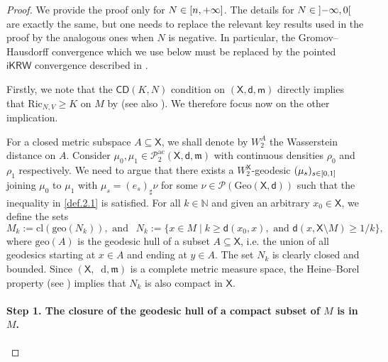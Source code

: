 \documentclass[11pt,twoside,a4paper]{article}
\newcommand*\diff{\mathop{}\!\mathrm{d}}
\newcommand{\N}{\mathbb{N}}
\newcommand{\cd}{\mathsf{CD}}
\newcommand{\X}{\mathsf{X}}
\newcommand{\di}
{\mathsf d} %
\theoremstyle{theorem}
\theoremstyle{definition}
\theoremstyle{remark}
\theoremstyle{proof}
\begin{document}
\begin{proof}
   We provide the proof only for $N \in \interval{n}{+\infty}$. The details for $N \in \ointerval{-\infty}{0}$ are exactly the same, but one needs to replace the relevant key results used in the proof by the analogous ones when $N$ is negative. In particular, the Gromov--Hausdorff convergence which we use below must be replaced by the pointed $\mathsf{iKRW}$ convergence described in \cite{chiara-mattia-sosa2023}.

   Firstly, we note that the $\cd(K,N)$ condition on $(\X, \di, \mathsf{m})$ directly implies that $\mathrm{Ric}_{N,V} \geq K$ on $M$ by \cite[Theorem 17.36]{villani} (see also \cite[Part (e) of the proof of Theorem 1.7]{sturm2006}). We therefore focus now on the other implication.

	For a closed metric subspace $A\subseteq \X$, we shall denote by $W_2^A$ the Wasserstein distance on $A$. Consider $\mu_0, \mu_1 \in \mathscr{P}_2^{\mathrm{ac}}(\X, \di, \mathfrak{m})$ with continuous densities $\rho_0$ and $\rho_1$ respectively. We need to argue that there exists a $W_2^\X$-geodesic $(\mu_s)_{s \in \interval{0}{1}}$ joining $\mu_0$ to $\mu_1$ with $\mu_s = (e_s)_\sharp\nu$ for some $\nu \in \mathscr{P}(\mathrm{Geo}(\X, \di))$ such that the inequality in \cref{def.2.1} is satisfied.
    For all $k \in \N$ and given an arbitrary $x_0 \in \X$, we define the sets
\[
M_k:=\mathrm{cl}(\mathrm{geo}(N_k)), \text{ and } \ \ N_k := \{x\in M\mid k \geq \di(x_0,x), \text{ and }\di(x,\X\setminus M)\geq 1/k\},
\]
where $\mathrm{geo}(A)$ is the geodesic hull of a subset $A \subseteq \X$, i.e. the union of all geodesics starting at $x \in A$ and ending at $y \in A$. The set $N_k$ is clearly closed and bounded. Since $(\X, \diff, \mathfrak{m})$ is a complete metric measure space, the Heine--Borel property (see \cite[Theorem 2.5.28]{burago-burago-sergei2001}) implies that $N_k$ is also compact in $\X$.

    \paragraph{Step 1. The closure of the geodesic hull of a compact subset of $M$ is in $M$.}


\end{proof}
\end{document}
